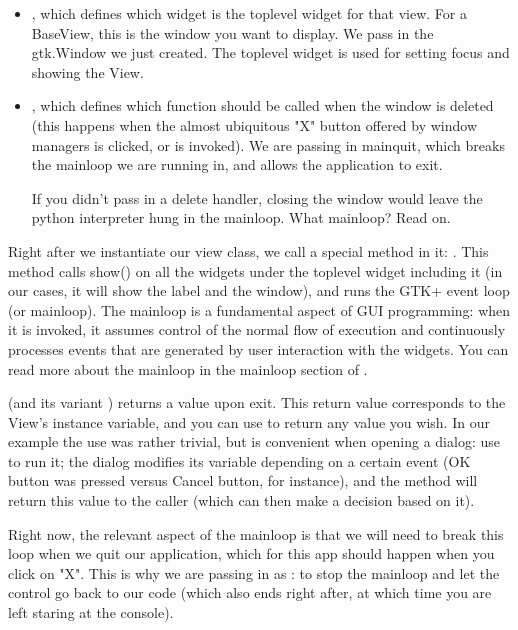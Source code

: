 \documentclass[a4paper]{howto}
\begin{document}
\begin{itemize}
\item {}, which defines which widget is the toplevel
widget for that view. For a BaseView, this is the window you want to
display. We pass in the gtk.Window we just created. The toplevel widget
is used for setting focus and showing the View.
\item {}, which defines which function should be
called when the window is deleted (this happens when the almost ubiquitous "X"
button offered by window managers is clicked, or  is
invoked). We are passing in mainquit, which breaks the mainloop we are
running in, and allows the application to exit.

If you didn't pass in a delete handler, closing the window would leave
the python interpreter hung in the mainloop. What mainloop? Read on.
\end{itemize}

Right after we instantiate our view class, we call a special method in
it: . This method calls show() on all the
widgets under the toplevel widget including it (in our cases, it will
show the label and the window), and runs the GTK+ event loop (or
mainloop). The mainloop is a fundamental aspect of GUI programming: when
it is invoked, it assumes control of the normal flow of execution and
continuously processes events that are generated by user interaction
with the widgets. You can read more about the mainloop in the mainloop
section of
.

 (and its variant )
returns a value upon exit. This return value corresponds to the View's
 instance variable, and you can use  to
return any value you wish. In our example the use was rather trivial,
but  is convenient when opening a dialog: use
 to run it; the dialog modifies its
 variable depending on a certain event (OK button was
pressed versus Cancel button, for instance), and the method will return
this value to the caller (which can then make a decision based on it).

Right now, the relevant aspect of the mainloop is that we will need to
break this loop when we quit our application, which for this app should
happen when you click on "X". This is why we are passing in
 as : to stop the mainloop and
let the control go back to our code (which also ends right after, at
which time you are left staring at the console).
\end{document}
